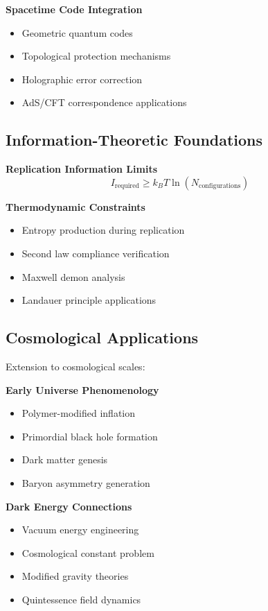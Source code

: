 \documentclass[11pt]{article}
\begin{document}
\textbf{Spacetime Code Integration}
\begin{itemize}
\item Geometric quantum codes
\item Topological protection mechanisms
\item Holographic error correction
\item AdS/CFT correspondence applications
\end{itemize}

\subsection{Information-Theoretic Foundations}

\textbf{Replication Information Limits}
\begin{equation}
I_{\text{required}} \geq k_B T \ln(N_{\text{configurations}})
\end{equation}

\textbf{Thermodynamic Constraints}
\begin{itemize}
\item Entropy production during replication
\item Second law compliance verification
\item Maxwell demon analysis
\item Landauer principle applications
\end{itemize}

\subsection{Cosmological Applications}

Extension to cosmological scales:

\textbf{Early Universe Phenomenology}
\begin{itemize}
\item Polymer-modified inflation
\item Primordial black hole formation
\item Dark matter genesis
\item Baryon asymmetry generation
\end{itemize}

\textbf{Dark Energy Connections}
\begin{itemize}
\item Vacuum energy engineering
\item Cosmological constant problem
\item Modified gravity theories
\item Quintessence field dynamics
\end{itemize}
\end{document}
